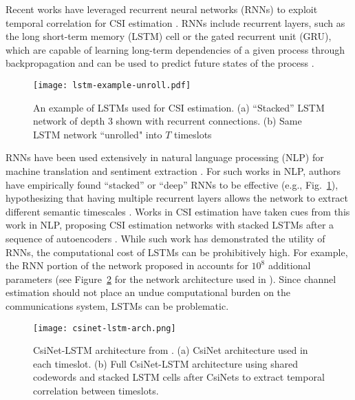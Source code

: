 Recent works have leveraged recurrent neural networks (RNNs) to exploit temporal correlation for CSI estimation \cite{ref:Lu2019RecCsiNet, ref:Liao2019BiLSTM, ref:Li2020SpatTempLSTM,
 ref:Jang2019Delay,ref:Wang2019CsiNetLSTM}. RNNs include recurrent layers, such as the long short-term memory (LSTM) cell or the gated recurrent unit (GRU), which are capable of learning long-term dependencies of a given process through backpropagation \cite{ref:Hermans2013Training} and can be used to predict future states of the process \cite{ref:Pascanu2014HowTo}.

\begin{figure}[htb]
	\centering
	\texttt{[image: lstm-example-unroll.pdf]}
	\medskip
	\caption{An example of LSTMs used for CSI estimation. (a) ``Stacked'' LSTM network of depth 3 shown with recurrent connections. (b) Same LSTM network ``unrolled" into $T$ timeslots }
	\label{fig:lstm_example}
\end{figure}

RNNs have been used extensively in natural language processing (NLP) for machine translation \cite{ref:Sutskever2014seq2seq} and sentiment extraction \cite{ref:Irsoy2014opinion}. For such works in NLP, authors have empirically found ``stacked'' or ``deep'' RNNs to be effective (e.g., Fig.~\ref{fig:lstm_example}), hypothesizing that having multiple recurrent layers allows the network to extract different semantic timescales \cite{ref:Irsoy2014opinion, ref:Bengio2009Learning}. Works in CSI estimation have taken cues from this work in NLP, proposing CSI estimation networks with stacked LSTMs after a sequence of autoencoders \cite{ref:Wang2019CsiNetLSTM}. While such work has demonstrated the utility of RNNs, the computational cost of LSTMs can be prohibitively high. For example, the RNN portion of the network proposed in \cite{ref:Wang2019CsiNetLSTM} accounts for $10^8$ additional parameters (see Figure~\ref{fig:csinet_lstm_arch} for the network architecture used in \cite{ref:Wang2019CsiNetLSTM}). Since channel estimation should not place an undue computational burden on the communications system, LSTMs can be problematic.

\begin{figure}[htb]
	\centering
	\texttt{[image: csinet-lstm-arch.png]}
	\caption{CsiNet-LSTM architecture from \cite{ref:Wang2019CsiNetLSTM}. (a) CsiNet architecture used in each timeslot. (b) Full CsiNet-LSTM architecture using shared codewords and stacked LSTM cells after CsiNets to extract temporal correlation between timeslots.}
	\label{fig:csinet_lstm_arch}
\end{figure}


